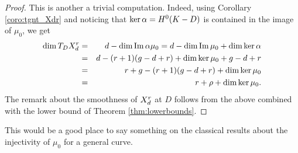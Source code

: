 	\begin{proof}
		This is another a trivial computation. Indeed, using Corollary \ref{coro:tgnt_Xdr} and noticing that $\ker\alpha=H^0(K-D)$ is contained in the image of $\mu_0$, we get
			\begin{eqnarray*}
				\dim T_D X_d^r 
				&=& d - \dim\operatorname{Im}\alpha\mu_0 = d - \dim\operatorname{Im}\mu_0 + \dim\ker\alpha \\
				&=& d - (r+1)(g-d+r) + \dim\ker\mu_0  + g-d+r \\
				&=& r + g - (r+1)(g-d+r) + \dim\ker\mu_0 \\ 
				&=& r + \rho + \dim\ker\mu_0.
			\end{eqnarray*}
			The remark about the smoothness of $X_d^r$ at $D$ follows from the above combined with the lower bound of Theorem \ref{thm:lowerbounds}.
	\end{proof}
	{\color{Blue}
		This would be a good place to say something on the classical results about the injectivity of $\mu_0$ for a general curve.
	}

	





